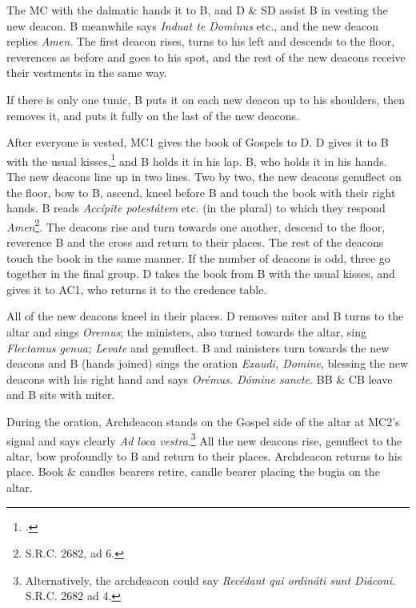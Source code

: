 \documentclass[letterpaper]{report}
\begin{document}
{    \rubric The MC with the dalmatic hands it to B, and D \& SD assist B in
    vesting the new deacon. B meanwhile says \textit{Induat te Dominus} etc.,
    and the new deacon replies \textit{Amen}. The first deacon rises, turns to his
    left and descends to the floor, reverences as before and goes to his spot,
    and the rest of the new deacons receive their vestments in the same way.

    \rubric If there is only one tunic, B puts it on each new deacon up to his
    shoulders, then removes it, and puts it fully on the last of the new
    deacons.

    \rubric After everyone is vested, MC1 gives the book of Gospels to D. D
    gives it to B with the usual kisses,\footcite[p. 116, n.
    104.1][]{levav:ordinations} and B holds it in his lap. B, who holds it in
    his hands. The new deacons line up in two lines. Two by two, the new
    deacons genuflect on the floor, bow to B, ascend, kneel before B and touch
    the book with their right hands. B reads \textit{Accípite potestátem} etc.
    (in the plural) to which they respond \textit{Amen}\footnote{S.R.C. 2682,
    ad 6.}. The deacons rise and turn towards one another, descend to the
    floor, reverence B and the cross and return to their places. The rest of
    the deacons touch the book in the same manner. If the number of deacons is
    odd, three go together in the final group. D takes the book from B with the
    usual kisses, and gives it to AC1, who returns it to the credence table.

    \rubric All of the new deacons kneel in their places. D removes miter and B
    turns to the altar and sings \textit{Oremus}; the ministers, also turned
    towards the altar, sing \textit{Flectamus genua; Levate} and genuflect. B
    and ministers turn towards the new deacons and B (hands joined) sings the
    oration \textit{Exaudi, Domine}, blessing the new deacons with his right
    hand and says \textit{Orémus. Dómine sancte}. BB \& CB leave and B sits
    with miter.

    \rubric During the oration, Archdeacon stands on the Gospel side of the
    altar at MC2's signal and says clearly \textit{Ad loca
    vestra}.\footnote{Alternatively, the archdeacon could say \textit{Recédant
    qui ordináti sunt Diáconi}. S.R.C. 2682 ad 4.} All the new deacons rise,
    genuflect to the altar, bow profoundly to B and return to their places.
    Archdeacon returns to his place. Book \& candles bearers retire, candle
    bearer placing the bugia on the altar. 

}
\end{document}
